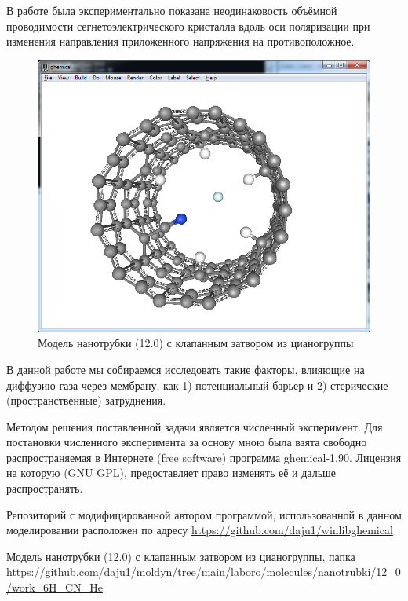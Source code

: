 \documentclass[12pt]{article}
\begin{document}
В работе \cite{KanaevMalinovsky1982} была экспериментально показана неодинаковость объёмной проводимости сегнетоэлектрического кристалла вдоль оси поляризации при изменения направления приложенного напряжения на противоположное.

\begin{figure}
    \centering
    \includegraphics[scale=0.45]{./molecules/nanotrubki/12_0/work_6H_CN_He/6H_CN_He.png}
    \caption{Модель нанотрубки (12.0) с клапанным затвором из цианогруппы}
\end{figure}

В данной работе мы собираемся исследовать такие факторы, влияющие на диффузию газа через мембрану, как 1) потенциальный барьер и 2) стерические (пространственные) затруднения.



Методом решения поставленной задачи является численный эксперимент. Для постановки численного эксперимента за основу мною была взята свободно распространяемая в Интернете (free software) программа ghemical-1.90. Лицензия на которую (GNU GPL), предоставляет право изменять её и дальше распространять.

Репозиторий с модифицированной автором программой, использованной в данном моделировании расположен по адресу  \url{https://github.com/daju1/winlibghemical}

Модель нанотрубки (12.0) с клапанным затвором из цианогруппы, папка \url{https://github.com/daju1/moldyn/tree/main/laboro/molecules/nanotrubki/12_0/work_6H_CN_He}
\end{document}
